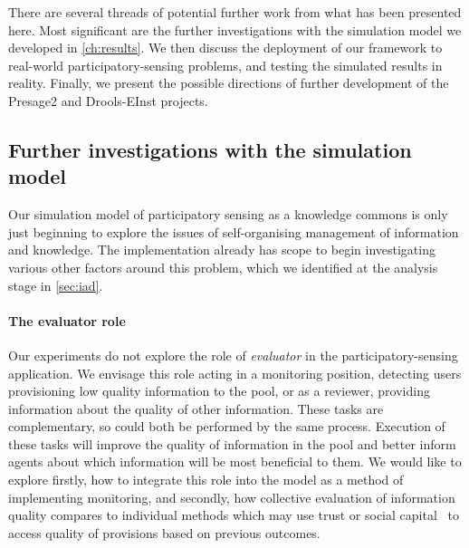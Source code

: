 There are several threads of potential further work from what has been
presented here. Most significant are the further investigations with the
simulation model we developed in \autoref{ch:results}. We then discuss the
deployment of our framework to real-world participatory-sensing problems, and
testing the simulated results in reality. Finally, we present the possible
directions of further development of the Presage2 and Drools-EInst projects.


\subsection{Further investigations with the simulation model}

Our simulation model of participatory sensing as a knowledge commons is only
just beginning to explore the issues of self-organising management of
information and knowledge. The implementation already has scope to begin
investigating various other factors around this problem, which we identified at
the analysis stage in \autoref{sec:iad}.


\paragraph{The evaluator role} Our experiments do not explore the role of
\emph{evaluator} in the participatory-sensing application. We envisage this
role acting in a monitoring position, detecting users provisioning low
quality information to the pool, or as a reviewer, providing information about
the quality of other information. These tasks are complementary, so could both
be performed by the same process. Execution of these tasks will improve the
quality of information in the pool and better inform agents about which
information will be most beneficial to them. We would like to explore
firstly, how to integrate this role into the model as a method of implementing
monitoring, and secondly, how collective evaluation of information quality
compares to individual methods which may use trust or social
capital~\citep{Petruzzi2014} to access quality of provisions based on previous
outcomes.

